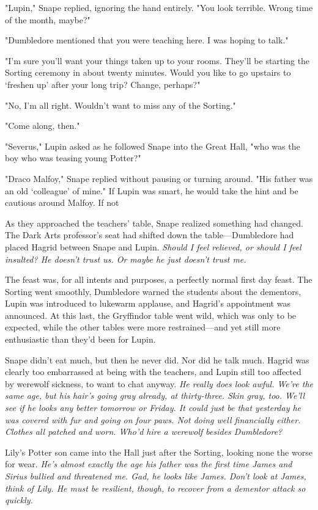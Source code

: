 "Lupin," Snape replied, ignoring the hand entirely. "You look terrible. Wrong time of the month, maybe?"

"Dumbledore mentioned that you were teaching here. I was hoping to talk."

"I'm sure you'll want your things taken up to your rooms. They'll be starting the Sorting ceremony in about twenty minutes. Would you like to go upstairs to `freshen up' after your long trip? Change, perhaps?"

"No, I'm all right. Wouldn't want to miss any of the Sorting."

"Come along, then."

"Severus," Lupin asked as he followed Snape into the Great Hall, "who was the boy who was teasing young Potter?"

"Draco Malfoy," Snape replied without pausing or turning around. "His father was an old `colleague' of mine." If Lupin was smart, he would take the hint and be cautious around Malfoy. If not{\el}

As they approached the teachers' table, Snape realized something had changed. The Dark Arts professor's seat had shifted down the table—Dumbledore had placed Hagrid between Snape and Lupin. \emph{Should I feel relieved, or should I feel insulted? He doesn't trust us. Or maybe he just doesn't trust me.}

The feast was, for all intents and purposes, a perfectly normal first day feast. The Sorting went smoothly, Dumbledore warned the students about the dementors, Lupin was introduced to lukewarm applause, and Hagrid's appointment was announced. At this last, the Gryffindor table went wild, which was only to be expected, while the other tables were more restrained—and yet still more enthusiastic than they'd been for Lupin.

Snape didn't eat much, but then he never did. Nor did he talk much. Hagrid was clearly too embarrassed at being with the teachers, and Lupin still too affected by werewolf sickness, to want to chat anyway. \emph{He really does look awful. We're the same age, but his hair's going gray already, at thirty-three. Skin gray, too. We'll see if he looks any better tomorrow or Friday. It could just be that yesterday he was covered with fur and going on four paws. Not doing well financially either. Clothes all patched and worn. Who'd hire a werewolf besides Dumbledore?}

Lily's Potter son came into the Hall just after the Sorting, looking none the worse for wear. \emph{He's almost exactly the age his father was the first time James and Sirius bullied and threatened me. Gad, he looks like James. Don't look at James, think of Lily. He must be resilient, though, to recover from a dementor attack so quickly.}

